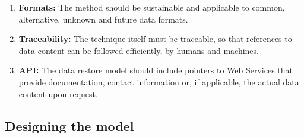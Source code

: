 \documentclass{sig-alternate}
\begin{document}
\begin{enumerate}
  \item \textbf{Formats:} The method should be sustainable and applicable to common, alternative, unknown and future data formats.

  \item \textbf{Traceability:} The technique itself must be traceable, so that references to data content can be followed efficiently, by humans and machines.
 

  \item \textbf{API:} The data restore model should include pointers to Web Services that provide documentation, contact information or, if applicable, the actual data content upon request.

\end{enumerate}




\subsection{Designing the model}
\end{document}
